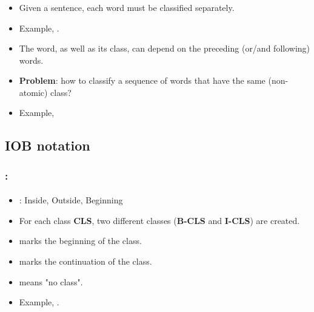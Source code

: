 \documentclass[xcolor=table]{beamer}
\begin{document}
\begin{frame}
	\frametitle{\insertshortsubtitle}
	\framesubtitle{\insertsection}
	
	\begin{itemize}
		\item Given a sentence, each word must be classified separately.
		\item Example, .
		\item The word, as well as its class, can depend on the preceding (or/and following) words.
		\item \textbf{Problem}: how to classify a sequence of words that have the same (non-atomic) class?
		\item Example, 
	\end{itemize}
	
\end{frame}

\subsection{IOB notation}

\begin{frame}
	\frametitle{\insertshortsubtitle: \insertsection}
	\framesubtitle{\insertsubsection}
	
	\begin{itemize}
		\item {}: Inside, Outside, Beginning
		\item For each class \textbf{CLS}, two different classes (\textbf{B-CLS} and \textbf{I-CLS}) are created.
		\item {} marks the beginning of the class.
		\item {} marks the continuation of the class.
		\item {} means "no class".
		\item Example, .
	\end{itemize}
\end{frame}
\end{document}
